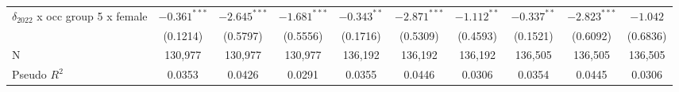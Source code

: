 \begin{tabular}{l|ccc|ccc|ccc}
$\delta_{2022}$ x occ group 5 x female &          $-0.361^{***}$ &  $-2.645^{***}$ &  $-1.681^{***}$ &            $-0.343^{**}$ &  $-2.871^{***}$ &   $-1.112^{**}$ &            $-0.337^{**}$ &  $-2.823^{***}$ &        $-1.042$ \\
                                       &                (0.1214) &        (0.5797) &        (0.5556) &                 (0.1716) &        (0.5309) &        (0.4593) &                 (0.1521) &        (0.6092) &        (0.6836) \\
N                                      &                 130,977 &         130,977 &         130,977 &                  136,192 &         136,192 &         136,192 &                  136,505 &         136,505 &         136,505 \\
Pseudo $R^2$                           &                  0.0353 &          0.0426 &          0.0291 &                   0.0355 &          0.0446 &          0.0306 &                   0.0354 &          0.0445 &          0.0306 \\
\bottomrule
\end{tabular}
